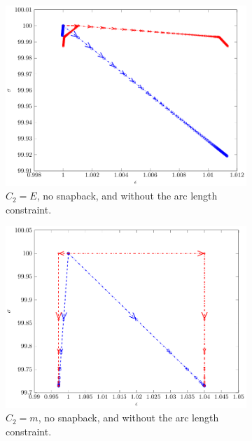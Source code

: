 \documentclass[11pt]{elsarticle}
\begin{document}
\begin{figure}[]
	\begin{subfigure}{0.45\textwidth}
		\centering
		\includegraphics[scale=0.7]{./conv_figs/bad_metric_no_snap.pdf}
		\caption{$C_2=E$, no snapback, and without the arc length constraint.}
		\label{bad_metric_no_snap}
	\end{subfigure}
	\hfill
	\begin{subfigure}{0.45\textwidth}
		\centering
		\includegraphics[scale=0.7]{./conv_figs/good_metric_no_snap.pdf}
		\caption{$C_2=m$, no snapback, and without the arc length constraint.}
		\label{good_metric_no_snap}
	\end{subfigure}
	\begin{subfigure}{0.45\textwidth}

\end{subfigure}
\end{figure}
\end{document}
